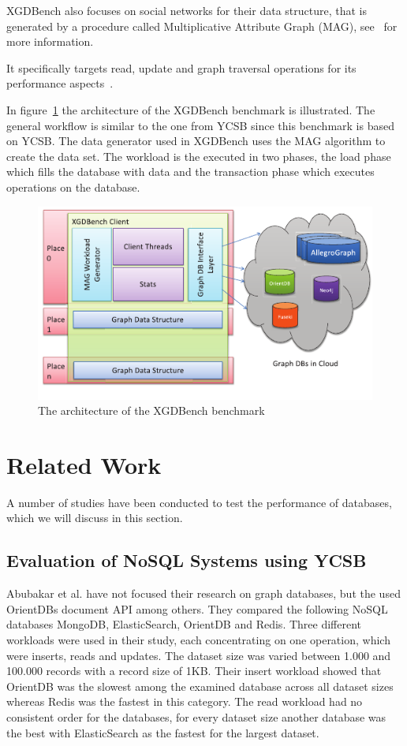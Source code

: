 XGDBench also focuses on social networks for their data structure,
that is generated by a procedure called Multiplicative Attribute Graph (MAG),
see~\cite{Kim2012} for more information.

It specifically targets read,
update and graph traversal operations for its performance aspects~\cite[366]{Dayarathna2012}.

In figure~\ref{fig:XGDBenchArchitecture} the architecture of the XGDBench benchmark is illustrated.
The general workflow is similar to the one from YCSB since this benchmark is based on YCSB.
The data generator used in XGDBench uses the MAG algorithm to create the data set.
The workload is the executed in two phases,
the load phase which fills the database with data and the transaction phase which executes operations on the database.

\begin{figure}[h!]
  \centering
  \includegraphics[width=.75\textwidth]{images/benchmarks/XGDBenchArchitecture}
  \caption{The architecture of the XGDBench benchmark\cite[367]{Dayarathna2012}}
  \label{fig:XGDBenchArchitecture}
\end{figure}

\section{Related Work}
A number of studies have been conducted to test the performance of databases,
which we will discuss in this section.

\subsection{Evaluation of NoSQL Systems using YCSB}
Abubakar et al. have not focused their research on graph databases,
but the used OrientDBs document API among others.
They compared the following NoSQL databases MongoDB, ElasticSearch, OrientDB and Redis.
Three different workloads were used in their study,
each concentrating on one operation,
which were inserts, reads and updates.
The dataset size was varied between 1.000 and 100.000 records with a record size of 1KB.
Their insert workload showed that OrientDB was the slowest among the examined database across all dataset sizes whereas Redis was the fastest in this category.
The read workload had no consistent order for the databases,
for every dataset size another database was the best with ElasticSearch as the fastest for the largest dataset.\cite{Abubakar2014}

